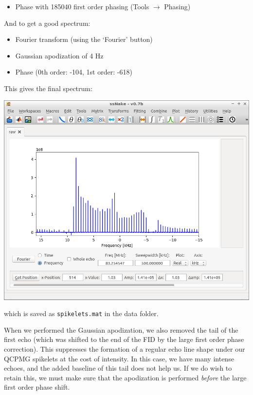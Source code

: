\documentclass[11pt,a4paper]{article}
\begin{document}
\begin{itemize}
  \item Phase with 185040 first order phasing (Tools $\longrightarrow$ Phasing)

\end{itemize}
And to get a good spectrum:
\begin{itemize}
	\item Fourier transform (using the `Fourier' button)
	\item Gaussian apodization of 4 Hz
	\item Phase (0th order: -104, 1st order: -618)
\end{itemize}
This gives the final spectrum: 
\begin{center}
\includegraphics[width=0.7\linewidth]{Figs/Fig9.png}
\end{center}
which is saved as \texttt{spikelets.mat} in the data folder.

When we performed the Gaussian apodization, we also removed the tail of the first echo (which was
shifted to the end of the FID by the large first order phase correction). This suppresses the
formation of a regular echo line shape under our QCPMG spikelets at the cost of intensity. In this
case, we have many intense echoes, and the added baseline of this tail does not help us. If we do
wish to retain this, we must make sure that the apodization is performed \textit{before} the large
first order phase shift.
\end{document}
